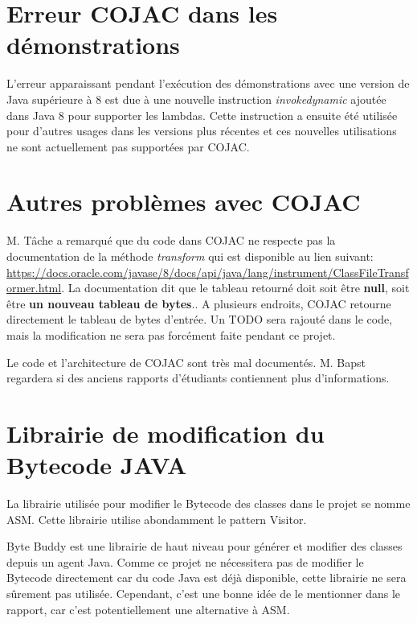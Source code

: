 \documentclass[11pt]{meetingmins}
\begin{document}
\section{Erreur COJAC dans les démonstrations}
\begin{hiddenitems}
    \item L'erreur apparaissant pendant l'exécution des démonstrations avec une version de Java supérieure à 8 est due à une nouvelle instruction \textit{invokedynamic} ajoutée dans Java 8 pour supporter les lambdas. Cette instruction a ensuite été utilisée pour d'autres usages dans les versions plus récentes et ces nouvelles utilisations ne sont actuellement pas supportées par COJAC.
\end{hiddenitems}

\section{Autres problèmes avec COJAC}
\begin{hiddenitems}
    \item M. Tâche a remarqué que du code dans COJAC ne respecte pas la documentation de la méthode \textit{transform} qui est disponible au lien suivant: \textcolor{blue}{\url{https://docs.oracle.com/javase/8/docs/api/java/lang/instrument/ClassFileTransformer.html}}. La documentation dit que le tableau retourné doit soit être \textbf{null}, soit être \textbf{un nouveau tableau de bytes}.. A plusieurs endroits, COJAC retourne directement le tableau de bytes d'entrée. Un TODO sera rajouté dans le code, mais la modification ne sera pas forcément faite pendant ce projet.
    \item Le code et l'architecture de COJAC sont très mal documentés. M. Bapst regardera si des anciens rapports d'étudiants contiennent plus d'informations.
\end{hiddenitems}

\section{Librairie de modification du Bytecode JAVA}
\begin{hiddenitems}
    \item La librairie utilisée pour modifier le Bytecode des classes dans le projet se nomme ASM. Cette librairie utilise abondamment le pattern Visitor.
    \item Byte Buddy est une librairie de haut niveau pour générer et modifier des classes depuis un agent Java. Comme ce projet ne nécessitera pas de modifier le Bytecode directement car du code Java est déjà disponible, cette librairie ne sera sûrement pas utilisée. Cependant, c'est une bonne idée de le mentionner dans le rapport, car c'est potentiellement une alternative à ASM.
\end{hiddenitems}
\end{document}
